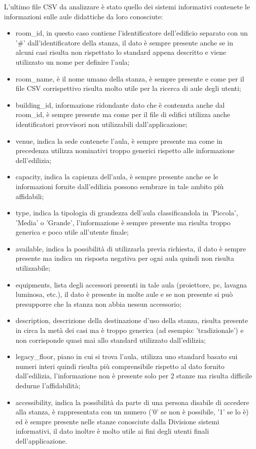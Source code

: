 \documentclass[12pt]{report}
\begin{document}
L'ultimo file CSV da analizzare è stato quello dei sistemi informativi contenete le informazioni sulle aule didattiche da loro conosciute:
\begin{itemize}
\item room\_id, in questo caso contiene l'identificatore dell'edificio separato con un '\#' dall'identificatore della stanza, il dato è sempre presente anche se in alcuni casi risulta non rispettato lo standard appena descritto e viene utilizzato un nome per definire l'aula;
\item room\_name, è il nome umano della stanza, è sempre presente e come per il file CSV corrispettivo risulta molto utile per la ricerca di aule degli utenti;
\item building\_id, informazione ridondante dato che è contenuta anche dal room\_id, è sempre presente ma come per il file di edifici utilizza anche identificatori provvisori non utilizzabili dall'applicazione;
\item venue, indica la sede contenete l'aula, è sempre presente ma come in precedenza utilizza nominativi troppo generici rispetto alle informazione dell'edilizia;
\item capacity, indica la capienza dell'aula, è sempre presente anche se le informazioni fornite dall'edilizia possono sembrare in tale ambito più affidabili;
\item type, indica la tipologia di grandezza dell'aula classificandola in 'Piccola', 'Media' o 'Grande', l'informazione è sempre presente ma risulta troppo generica e poco utile all'utente finale;
\item available, indica la possibilità di utilizzarla previa richiesta, il dato è sempre presente ma indica un risposta negativa per ogni aula quindi non risulta utilizzabile;
\item equipments, lista degli accessori presenti in tale aula (proiettore, pc, lavagna luminosa, etc.), il dato è presente in molte aule e se non presente si può presupporre che la stanza non abbia nessun accessorio;
\item description, descrizione della destinazione d'uso della stanza, risulta presente in circa la metà dei casi ma è troppo generica (ad esempio: 'tradizionale') e non corrisponde quasi mai allo standard utilizzato dall'edilizia;
\item legacy\_floor, piano in cui si trova l'aula, utilizza uno standard basato sui numeri interi quindi risulta più comprensibile rispetto al dato fornito dall'edilizia, l'informazione non è presente solo per 2 stanze ma risulta difficile dedurne l'affidabilità;
\item accessibility, indica la possibilità da parte di una persona disabile di accedere alla stanza, è rappresentata con un numero ('0' se non è possibile, '1' se lo è) ed è sempre presente nelle stanze conosciute dalla Divisione sistemi informativi, il dato inoltre è molto utile ai fini degli utenti finali dell'applicazione. 
\end{itemize}
\end{document}
